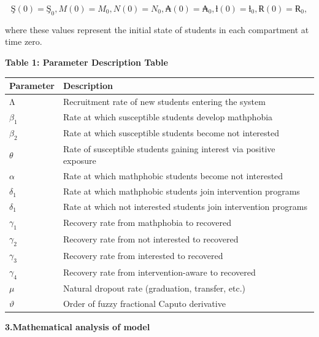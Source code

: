 \documentclass[
]{article}
\newcounter{none} %
\begin{document}
\[Ş(0) = Ş_{0},M(0) = M_{0},N(0) = N_{0},₳(0) = ₳_{0},ƚ(0) = ƚ_{0},Ɍ(0) = Ɍ_{0},\]

where these values represent the initial state of students in each compartment at time zero.

\textbf{Table 1: Parameter Description Table}

{\def\LTcaptype{none} %
\begin{longtable}[]{@{}
  >{\centering\arraybackslash}p{}
  >{\raggedright\arraybackslash}p{}@{}}
\toprule\noalign{}
\begin{minipage}[b]{\linewidth}\centering
\textbf{Parameter}
\end{minipage} & \begin{minipage}[b]{\linewidth}\raggedright
\textbf{Description}
\end{minipage} \\
\midrule\noalign{}
\endhead
\bottomrule\noalign{}
\endlastfoot
Λ & Recruitment rate of new students entering the system \\
\(\beta_{1}\) & Rate at which susceptible students develop mathphobia \\
\(\beta_{2}\) & Rate at which susceptible students become not interested \\
\(\theta\) & Rate of susceptible students gaining interest via positive exposure \\
\(\alpha\) & Rate at which mathphobic students become not interested \\
\(\delta_{1}\) & Rate at which mathphobic students join intervention programs \\
\(\delta_{1}\) & Rate at which not interested students join intervention programs \\
\(\gamma_{1}\) & Recovery rate from mathphobia to recovered \\
\(\gamma_{2}\) & Recovery rate from not interested to recovered \\
\(\gamma_{3}\) & Recovery rate from interested to recovered \\
\(\gamma_{4}\) & Recovery rate from intervention-aware to recovered \\
\(\mu\) & Natural dropout rate (graduation, transfer, etc.) \\
\(\vartheta\) & Order of fuzzy fractional Caputo derivative \\
\end{longtable}
}

\textbf{3.Mathematical analysis of model}
\end{document}
